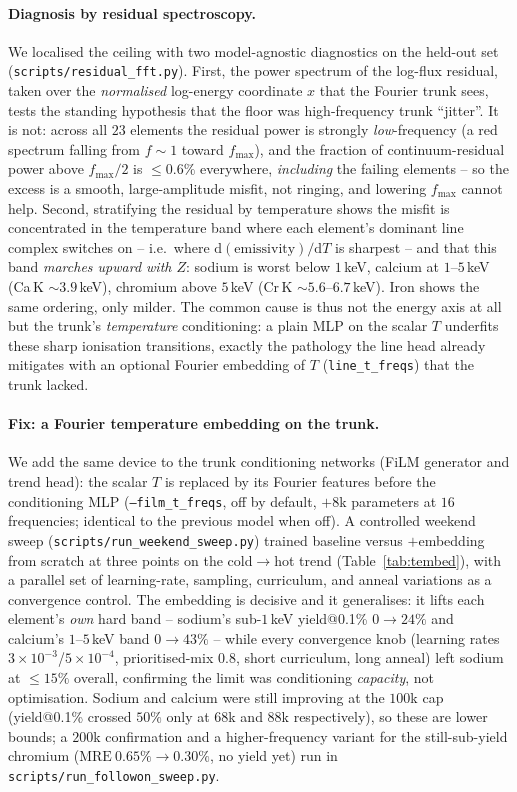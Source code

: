 \documentclass[11pt,a4paper]{article}
\newcommand{\code}[1]{\texttt{#1}}
\begin{document}
\paragraph{Diagnosis by residual spectroscopy.} We localised the ceiling
with two model-agnostic diagnostics on the held-out set
(\code{scripts/residual\_fft.py}). First, the power spectrum of the
log-flux residual, taken over the \emph{normalised} log-energy coordinate
$x$ that the Fourier trunk sees, tests the standing hypothesis that the
floor was high-frequency trunk ``jitter''. It is not: across all $23$
elements the residual power is strongly \emph{low}-frequency (a red
spectrum falling from $f\!\sim\!1$ toward $f_{\max}$), and the fraction of
continuum-residual power above $f_{\max}/2$ is $\le0.6\%$ everywhere,
\emph{including} the failing elements -- so the excess is a smooth,
large-amplitude misfit, not ringing, and lowering $f_{\max}$ cannot help.
Second, stratifying the residual by temperature shows the misfit is
concentrated in the temperature band where each element's dominant line
complex switches on -- i.e.\ where $\mathrm{d}(\text{emissivity})/
\mathrm{d}T$ is sharpest -- and that this band \emph{marches upward with
$Z$}: sodium is worst below $1$\,keV, calcium at $1$--$5$\,keV (Ca\,K
$\sim3.9$\,keV), chromium above $5$\,keV (Cr\,K $\sim5.6$--$6.7$\,keV).
Iron shows the same ordering, only milder. The common cause is thus not
the energy axis at all but the trunk's \emph{temperature} conditioning: a
plain MLP on the scalar $T$ underfits these sharp ionisation transitions,
exactly the pathology the line head already mitigates with an optional
Fourier embedding of $T$ (\code{line\_t\_freqs}) that the trunk lacked.

\paragraph{Fix: a Fourier temperature embedding on the trunk.} We add the
same device to the trunk conditioning networks (FiLM generator and trend
head): the scalar $T$ is replaced by its Fourier features before the
conditioning MLP (\code{--film\_t\_freqs}, off by default, $+8$k
parameters at $16$ frequencies; identical to the previous model when
off). A controlled weekend sweep
(\code{scripts/run\_weekend\_sweep.py}) trained baseline versus
$+$embedding from scratch at three points on the cold$\to$hot trend
(Table~\ref{tab:tembed}), with a parallel set of learning-rate, sampling,
curriculum, and anneal variations as a convergence control. The embedding
is decisive and it generalises: it lifts each element's \emph{own} hard
band -- sodium's sub-$1$\,keV yield@0.1\% $0\to24\%$ and calcium's
$1$--$5$\,keV band $0\to43\%$ -- while every convergence knob (learning
rates $3\times10^{-3}$/$5\times10^{-4}$, prioritised-mix $0.8$, short
curriculum, long anneal) left sodium at $\le15\%$ overall, confirming the
limit was conditioning \emph{capacity}, not optimisation. Sodium and
calcium were still improving at the $100$k cap (yield@0.1\% crossed
$50\%$ only at $68$k and $88$k respectively), so these are lower bounds; a
$200$k confirmation and a higher-frequency variant for the still-sub-yield
chromium ($\text{MRE}\ 0.65\%\to0.30\%$, no yield yet) run in
\code{scripts/run\_followon\_sweep.py}.
\end{document}
